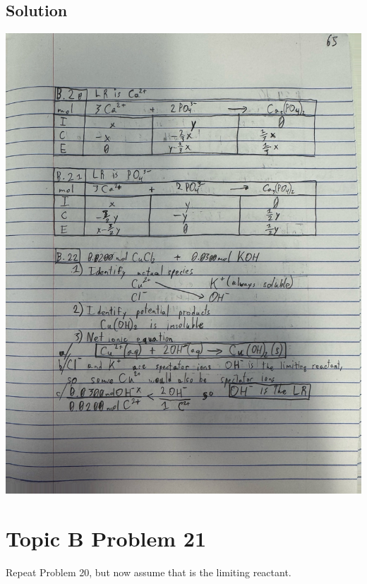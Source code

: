 \documentclass[10pt]{article}
\begin{document}
        \subsection{Solution}
            \begin{center}
                \includegraphics[width=\textwidth, trim={5in 40in 3in 5in},clip]{"Answers Images/IMG_6651.jpg"}
            \end{center}

    \pagebreak
    \section{Topic B Problem 21}
        Repeat Problem 20, but now assume that  is the limiting reactant.
\end{document}
